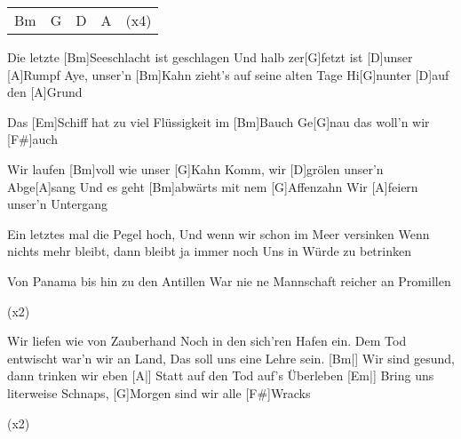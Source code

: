 

\begin{guitar}
	{\footnotesize\begin{tabular}{l|l|l|l|l}
			Bm & G & D & A & (x4)
	\end{tabular}}
	
	Die letzte [Bm]Seeschlacht ist geschlagen
	Und halb zer[G]fetzt ist [D]unser [A]Rumpf
	Aye, unser'n [Bm]Kahn zieht's auf seine alten Tage
	Hi[G]nunter [D]auf den [A]Grund
	
	Das [Em]Schiff hat zu viel Flüssigkeit im [Bm]Bauch
	Ge[G]nau das woll'n wir [F#]auch
	
	Wir laufen [Bm]voll wie unser [G]Kahn
	Komm, wir [D]grölen unser'n Abge[A]sang
	Und es geht [Bm]abwärts mit nem [G]Affenzahn
	Wir [A]feiern unser'n Untergang
	
	
	Ein letztes mal die Pegel hoch,
	Und wenn wir schon im Meer versinken
	Wenn nichts mehr bleibt, dann bleibt ja immer noch
	Uns in Würde zu betrinken
	
	Von Panama bis hin zu den Antillen
	War nie ne Mannschaft reicher an Promillen
	
	 (x2)
	
	\pagebreak
	
	Wir liefen wie von Zauberhand
	Noch in den sich'ren Hafen ein.
	Dem Tod entwischt war'n wir an Land,
	Das soll uns eine Lehre sein.
	[Bm|] Wir sind gesund, dann trinken wir eben
	[A|] Statt auf den Tod auf's Überleben
	[Em|] Bring uns literweise Schnaps,
	[G]Morgen sind wir alle [F#]Wracks
	
	 (x2)
	
\end{guitar}